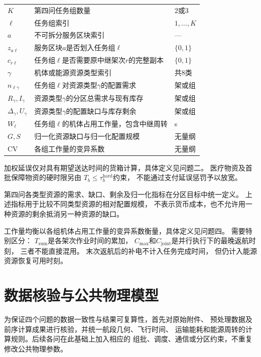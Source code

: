 \documentclass[bwprint]{gmcmthesis}
\begin{document}
\begin{longtable}{
    >{\raggedright\arraybackslash}p{2.8cm}
    >{\raggedright\arraybackslash}p{8.4cm}
    >{\raggedright\arraybackslash}p{2cm}
}
    $K$ & 第四问任务组数量 & $2$或$3$ \\
    $\ell$ & 任务组索引 & $1,\ldots,K$ \\
    $a$ & 不可拆分服务区块索引 & --- \\
    $z_{a\ell}$ &
    服务区块$a$是否划入任务组$\ell$ & $\{0,1\}$ \\
    $c_{r\ell}$ &
    任务组$\ell$是否需要原中继架次$r$的完整副本 & $\{0,1\}$ \\
    $\gamma$ & 机体或能源资源类型索引 & 共8类 \\
    $n_{\ell\gamma}$ &
    任务组$\ell$对资源类型$\gamma$的配置需求 & 架或组 \\
    $R_\gamma,I_\gamma$ &
    资源类型$\gamma$的分区总需求与现有库存 & 架或组 \\
    $\Delta_\gamma,U_\gamma$ &
    资源类型$\gamma$的配置缺口与库存剩余 & 架或组 \\
    $W_\ell$ &
    任务组$\ell$的机体占用工作量，包含中继周转 & s \\
    $G,S$ & 归一化资源缺口与归一化配置规模 & 无量纲 \\
    $\mathrm{CV}$ & 各组工作量的变异系数 & 无量纲 \\

\end{longtable}

加权延误仅对具有期望送达时间的货箱计算，具体定义见问题二。
医疗物资及首批保障物资的硬时限另由
$T_b\leq \tau_b^{\mathrm{hard}}$约束，
不能通过支付延误惩罚予以放宽。

第四问各类型资源的需求、缺口、剩余及归一化指标在分区目标中统一定义。
上述指标用于比较不同类型资源的相对配置规模，
不表示货币成本，也不允许用一种资源的剩余抵消另一种资源的缺口。

工作量均衡以各组机体占用工作量的变异系数衡量，具体定义见问题四。
需要特别区分：
$T_{\mathrm{sum}}$是各架次作业时间的累加，
$C_{\max}$和$C_{\mathrm{joint}}$是并行执行下的最晚返航时刻，
三者不能直接混用。
末次返航后的补电不计入任务完成时间，
但仍计入能源资源恢复可用时刻。



\section{数据核验与公共物理模型}

为保证四个问题的数据一致性与结果可复算性，首先对原始附件、
预处理数据及前序计算成果进行核验，并统一航段几何、飞行时间、
运输能耗和能源周转的计算规则。后续各问在此基础上加入相应的
组批、调度、通信或分区约束，不重复修改公共物理参数。
\end{document}
